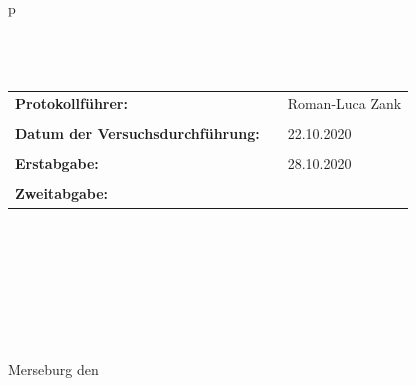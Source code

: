 \begin{center}
\begin{tabular}{p{\textwidth}}
\\ \\ \\ \\

\begin{center}
\begin{tabular}{lll}
\large{\textbf{Protokollführer:}} & & \large{Roman-Luca Zank}\\
&&\\
\large{\textbf{Datum der Versuchsdurchführung:}}&& \large{22.10.2020}\\
&&\\
\large{\textbf{Erstabgabe:}}&& \large{28.10.2020}\\
&&\\
\large{\textbf{Zweitabgabe:}}&& \large{\todayDE}
\end{tabular}
\end{center}

\\ \\ \\ \\ \\ \\ \\
\large{Merseburg den \todayDE}

\end{tabular}
\end{center}

